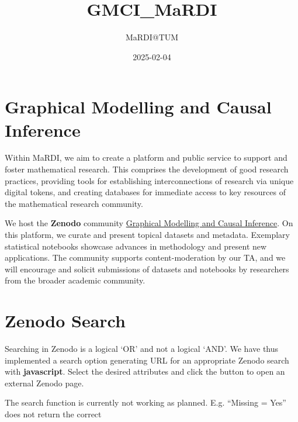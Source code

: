 \documentclass[
  letterpaper,
  DIV=11,
  numbers=noendperiod]{scrreprt}
\title{GMCI\_MaRDI}
\author{MaRDI@TUM}
\date{2025-02-04}
\renewcommand*\contentsname{Table of contents}
\newcommand\contentsname{Table of contents}
\begin{document}
\maketitle

\renewcommand*\contentsname{Table of contents}
{
\hypersetup{linkcolor=}
\setcounter{tocdepth}{2}
\tableofcontents
}


\chapter*{Graphical Modelling and Causal
Inference}\label{graphical-modelling-and-causal-inference}


Within MaRDI, we aim to create a platform and public service to support
and foster mathematical research. This comprises the development of good
research practices, providing tools for establishing interconnections of
research via unique digital tokens, and creating databases for immediate
access to key resources of the mathematical research community.

We host the \textbf{Zenodo} community
\href{https://zenodo.org/communities/mardigmci/records?q=&l=list&p=1&s=10}{Graphical
Modelling and Causal Inference}. On this platform, we curate and present
topical datasets and metadata. Exemplary statistical notebooks showcase
advances in methodology and present new applications. The community
supports content-moderation by our TA, and we will encourage and solicit
submissions of datasets and notebooks by researchers from the broader
academic community.


\chapter{Zenodo Search}\label{zenodo-search}

Searching in Zenodo is a logical `OR' and not a logical `AND'. We have
thus implemented a search option generating URL for an appropriate
Zenodo search with \textbf{javascript}. Select the desired attributes
and click the button to open an external Zenodo page.

The search function is currently not working as planned. E.g. ``Missing
= Yes'' does not return the correct
\end{document}

